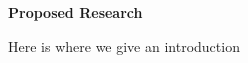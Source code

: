 \documentclass[11pt]{NSFamsart}
\begin{document}

\centerline{\large \bf Proposed Research}

Here is where we give an introduction






\newpage



\renewcommand{\refname}{\hfil Bibliography \& References Cited \hfil}                   %
\renewcommand{\bibliofont}{\normalsize}


\end{document}
